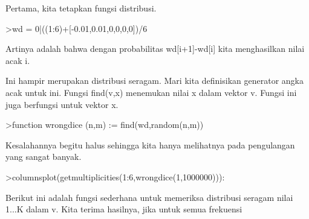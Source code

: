 \documentclass[a4paper,10pt]{article}
\begin{document}
\begin{eulernotebook}
\begin{eulercomment}
Pertama, kita tetapkan fungsi distribusi.
\end{eulercomment}
\begin{eulerprompt}
>wd = 0|((1:6)+[-0.01,0.01,0,0,0,0])/6
\end{eulerprompt}
\begin{euleroutput}
  [0,  0.165,  0.335,  0.5,  0.666667,  0.833333,  1]
\end{euleroutput}
\begin{eulercomment}
Artinya adalah bahwa dengan probabilitas wd[i+1]-wd[i] kita
menghasilkan nilai acak i.

Ini hampir merupakan distribusi seragam. Mari kita definisikan
generator angka acak untuk ini. Fungsi find(v,x) menemukan nilai x
dalam vektor v. Fungsi ini juga berfungsi untuk vektor x.
\end{eulercomment}
\begin{eulerprompt}
>function wrongdice (n,m) := find(wd,random(n,m))
\end{eulerprompt}
\begin{eulercomment}
Kesalahannya begitu halus sehingga kita hanya melihatnya pada
pengulangan yang sangat banyak.
\end{eulercomment}
\begin{eulerprompt}
>columnsplot(getmultiplicities(1:6,wrongdice(1,1000000))):
\end{eulerprompt}
\begin{eulercomment}
Berikut ini adalah fungsi sederhana untuk memeriksa distribusi seragam
nilai 1...K dalam v. Kita terima hasilnya, jika untuk semua frekuensi


\end{eulercomment}
\end{eulernotebook}
\end{document}
